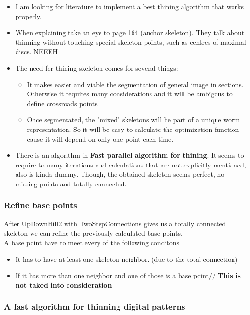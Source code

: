 \documentclass{article}
\begin{document}
\begin{itemize}
\item I am looking for literature to implement a best thining algorithm
  that works properly.
\item When explaining take an eye to page 164 (anchor skeleton). They
  talk about thinning without touching special skeleton points, such 
  as centres of maximal discs. NEEEH
\item The need for thining skeleton comes for several things:
  \begin{itemize}
  \item It makes easier and viable the segmentation of general image 
    in sections. Otherwise it requires many considerations
    and it will be ambigous to define crossroads points
  \item Once segmentated, the "mixed" skeletons will be part of a unique
    worm representation. So it will be easy to calculate the optimization
    function cause it will depend on only one point each time.
  \end{itemize}
\item There is an algorithm in \textbf{Fast parallel algorithm for thining}.
  It seems to require to many iterations and calculations that are not 
  explicitly mentioned, also is kinda dummy. Though, the 
  obtained skeleton seems perfect, no missing points and totally connected.
\end{itemize}

\subsubsection{Refine base points}

After UpDownHill2 with TwoStepConnections gives us a totally connected
skeleton we can refine the previously calculated base points.\\
A base point have to meet every of the following conditons

\begin{itemize}
\item It has to have at least one skeleton neighbor. (due to the total
  connection)
\item If it has more than one neighbor and one of those is a base point//
  \textbf{This is not taked into consideration}

\end{itemize}

\subsubsection{A fast algorithm for thinning digital patterns}
\end{document}

